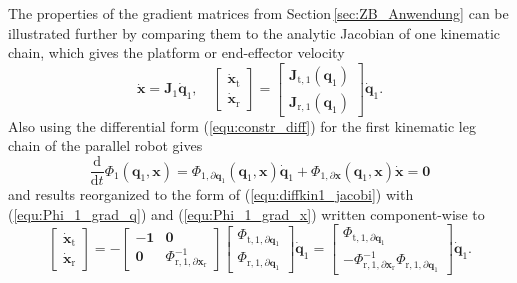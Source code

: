 \documentclass[robotics,article,accept,moreauthors,pdftex]{Definitions/mdpi}
\newcommand{\bm}[1]{\boldsymbol{#1}}
\let\Phi\varPhi
\begin{document}
The properties of the gradient matrices from Section\,\ref{sec:ZB_Anwendung} can be illustrated further by comparing them to the analytic Jacobian of one kinematic chain, which gives the platform or end-effector velocity 
%
\begin{equation}
\dot{\bm{x}} = \bm{J}_1 \dot{\bm{q}}_1,
\quad
\begin{bmatrix}
\dot{\bm{x}}_\mathrm{t}\\
\dot{\bm{x}}_\mathrm{r}
\end{bmatrix}
= 
\begin{bmatrix}
\bm{J}_{\mathrm{t},1}(\bm{q}_1)\\
\bm{J}_{\mathrm{r},1}(\bm{q}_1) 
\end{bmatrix}
\dot{\bm{q}}_1.
\label{equ:diffkin1_jacobi}
\end{equation}
%
Also using the differential form (\ref{equ:constr_diff}) for the first kinematic leg chain of the parallel robot gives
%
\begin{equation}
\frac{\mathrm{d}}{\mathrm{d}t} \bm{\Phi}_1(\bm{q}_1,\bm{x})
=
\bm{\Phi}_{1,\partial\bm{q}_1}(\bm{q}_1,\bm{x}) \dot{\bm{q}}_1 + \bm{\Phi}_{1,\partial\bm{x}}(\bm{q}_1,\bm{x}) \dot{\bm{x}} 
=
\bm{0}
\label{equ:constr_diff1}
\end{equation}
%
and results reorganized to the form of (\ref{equ:diffkin1_jacobi}) with (\ref{equ:Phi_1_grad_q}) and (\ref{equ:Phi_1_grad_x}) written component-wise to
%
\begin{equation}
\begin{bmatrix}
\dot{\bm{x}}_\mathrm{t}\\
\dot{\bm{x}}_\mathrm{r}
\end{bmatrix}
=
-
\begin{bmatrix}
-\bm{1} & \bm{0} \\
\bm{0} & \bm{\Phi}_{\mathrm{r},1,\partial\bm{x}_\mathrm{r}}^{-1}
\end{bmatrix}
\begin{bmatrix}
\bm{\Phi}_{\mathrm{t},1,\partial\bm{q}_1}
\\
\bm{\Phi}_{\mathrm{r},1,\partial\bm{q}_1}
\end{bmatrix}
\dot{\bm{q}}_1
=
\begin{bmatrix}
\bm{\Phi}_{\mathrm{t},1,\partial\bm{q}_1} \\
-\bm{\Phi}_{\mathrm{r},1,\partial\bm{x}_\mathrm{r}}^{-1} \bm{\Phi}_{\mathrm{r},1,\partial\bm{q}_1}
\end{bmatrix}
\dot{\bm{q}}_1.
\label{equ:diffkin1_gradmat}
\end{equation}
\end{document}

